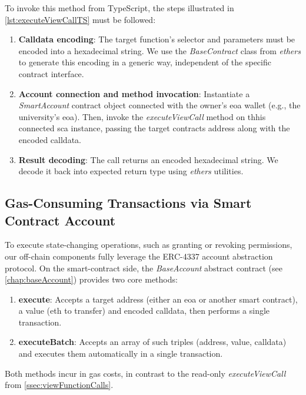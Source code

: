 To invoke this method from TypeScript, the steps illustrated in \cref{lst:executeViewCallTS} must be followed:
\begin{enumerate}
    \item \textbf{Calldata encoding}: The target function’s selector and parameters must be encoded into a hexadecimal string. We use the \textit{BaseContract} class from \textit{ethers} to generate this encoding in a generic way, independent of the specific contract interface.
    \item \textbf{Account connection and method invocation}: Instantiate a \textit{SmartAccount} contract object connected with the owner’s \acrshort{eoa} wallet (e.g., the university’s \acrshort{eoa}). Then, invoke the \textit{executeViewCall} method on thhis connected \acrshort{sca} instance, passing the target contracts address along with the encoded calldata.
    \item \textbf{Result decoding}: The call returns an encoded hexadecimal string. We decode it back into expected return type using \textit{ethers} utilities.
\end{enumerate}


\subsection{Gas-Consuming Transactions via Smart Contract Account}
To execute state-changing operations, such as granting or revoking permissions, our off-chain components fully leverage the ERC-4337 account abstraction protocol. On the smart-contract side, the \textit{BaseAccount} abstract contract (see \cref{chap:baseAccount}) provides two core methods:
\begin{enumerate}
    \item \textbf{execute}: Accepts a target address (either an \acrshort{eoa} or another smart contract), a value (\acrshort{eth} to transfer) and encoded calldata, then performs a single transaction.
    \item \textbf{executeBatch}: Accepts an array of such triples (address, value, calldata) and executes them automatically in a single transaction.
\end{enumerate}

Both methods incur in gas costs, in contrast to the read-only \textit{executeViewCall} from \cref{ssec:viewFunctionCalls}.

